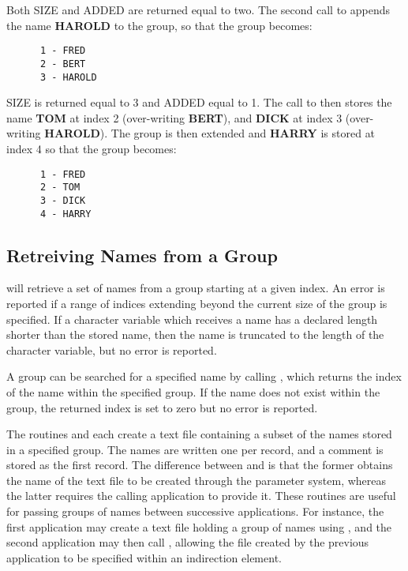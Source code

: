 Both SIZE and ADDED are returned equal to two. The second call to 
appends the name {\bf HAROLD} to the group, so that the group becomes:

\small
\begin{verbatim}
      1 - FRED
      2 - BERT
      3 - HAROLD
\end{verbatim}
\normalsize

SIZE is returned equal to 3 and ADDED equal to 1. The call to 
then stores the name {\bf TOM} at index 2 (over-writing {\bf BERT}), and {\bf
DICK} at index 3 (over-writing {\bf HAROLD}). The group is then extended and
{\bf HARRY} is stored at index 4 so that the group becomes:

\small
\begin{verbatim}
      1 - FRED
      2 - TOM
      3 - DICK
      4 - HARRY
\end{verbatim}
\normalsize

\subsection{Retreiving Names from a Group}
 will retrieve a set of names from a group starting at a given index. An
error is reported if a range of indices extending beyond the current size of
the group is specified. If a character variable which receives a name  has a
declared length shorter than the stored name, then the name is truncated to the
length of the character variable, but no error is reported.

A group can be searched for a specified name by calling , which
returns the index of the name within the specified group. If the name does
not exist within the group, the returned index is set to zero but no error is
reported.

The routines  and 
each create a text file containing a
subset of the names stored in a specified group. The names are written one per
record, and a comment is stored as the first record. The difference between
 and  is that the former
obtains the name of the text file to
be created through the parameter system, whereas the latter requires the calling
application to provide it. These routines are useful for passing groups of names
between successive applications. For instance, the first application may create
a text file holding a group of names using , and the second application
may then call , allowing the file created by the previous application
to be specified within an indirection element.

